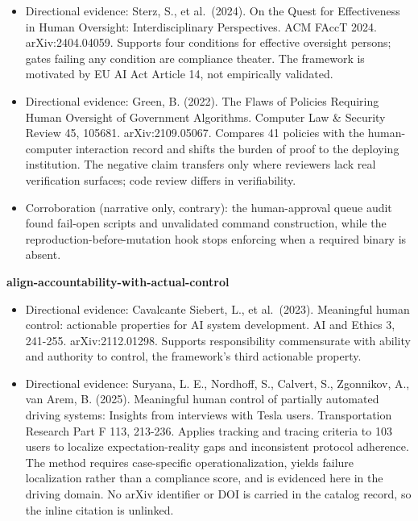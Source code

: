 \begin{itemize}
\tightlist
\item
  Directional evidence: Sterz, S., et al.~(2024). On the Quest for Effectiveness in Human Oversight: Interdisciplinary Perspectives. ACM FAccT 2024. arXiv:2404.04059. Supports four conditions for effective oversight persons; gates failing any condition are compliance theater. The framework is motivated by EU AI Act Article 14, not empirically validated.
\item
  Directional evidence: Green, B. (2022). The Flaws of Policies Requiring Human Oversight of Government Algorithms. Computer Law \& Security Review 45, 105681. arXiv:2109.05067. Compares 41 policies with the human-computer interaction record and shifts the burden of proof to the deploying institution. The negative claim transfers only where reviewers lack real verification surfaces; code review differs in verifiability.
\item
  Corroboration (narrative only, contrary): the human-approval queue audit found fail-open scripts and unvalidated command construction, while the reproduction-before-mutation hook stops enforcing when a required binary is absent.
\end{itemize}

\textbf{align-accountability-with-actual-control}

\begin{itemize}
\tightlist
\item
  Directional evidence: Cavalcante Siebert, L., et al.~(2023). Meaningful human control: actionable properties for AI system development. AI and Ethics 3, 241-255. arXiv:2112.01298. Supports responsibility commensurate with ability and authority to control, the framework's third actionable property.
\item
  Directional evidence: Suryana, L. E., Nordhoff, S., Calvert, S., Zgonnikov, A., van Arem, B. (2025). Meaningful human control of partially automated driving systems: Insights from interviews with Tesla users. Transportation Research Part F 113, 213-236. Applies tracking and tracing criteria to 103 users to localize expectation-reality gaps and inconsistent protocol adherence. The method requires case-specific operationalization, yields failure localization rather than a compliance score, and is evidenced here in the driving domain. No arXiv identifier or DOI is carried in the catalog record, so the inline citation is unlinked.
\end{itemize}
